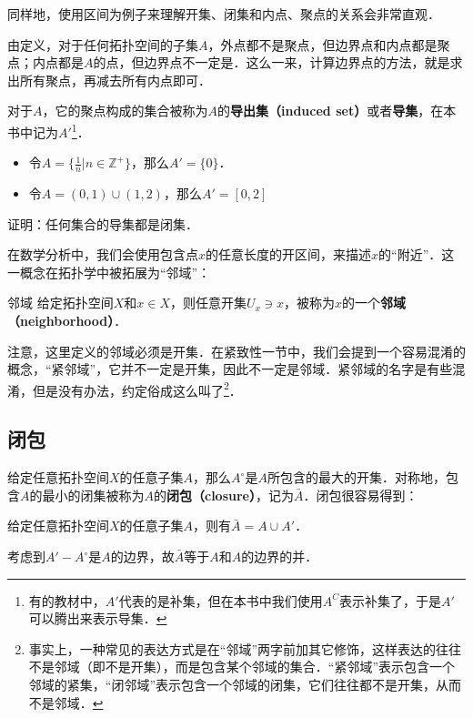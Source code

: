 同样地，使用区间为例子来理解开集、闭集和内点、聚点的关系会非常直观．

由定义，对于任何拓扑空间的子集$A$，外点都不是聚点，但边界点和内点都是聚点；内点都是$A$的点，但边界点不一定是．这么一来，计算边界点的方法，就是求出所有聚点，再减去所有内点即可．

对于$A$，它的聚点构成的集合被称为$A$的\textbf{导出集（induced set）}或者\textbf{导集}，在本书中记为$A'$\footnote{有的教材中，$A'$代表的是补集，但在本书中我们使用$A^C$表示补集了，于是$A'$可以腾出来表示导集．}．

\begin{example}{}
\begin{itemize}
\item 令$A=\{\frac{1}{n}|n\in\mathbb{Z}^+\}$，那么$A'=\{0\}$．
\item 令$A=(0,1)\cup(1,2)$，那么$A'=[0,2]$
\end{itemize}
\end{example}

\begin{exercise}{}
证明：任何集合的导集都是闭集．
\end{exercise}

在数学分析中，我们会使用包含点$x$的任意长度的开区间，来描述$x$的“附近”．这一概念在拓扑学中被拓展为“邻域”：

\begin{definition}{邻域}
给定拓扑空间$X$和$x\in X$，则任意开集$U_x\ni x$，被称为$x$的一个\textbf{邻域（neighborhood）}．
\end{definition}

注意，这里定义的邻域必须是开集．在紧致性一节中，我们会提到一个容易混淆的概念，“紧邻域”，它并不一定是开集，因此不一定是邻域．紧邻域的名字是有些混淆，但是没有办法，约定俗成这么叫了\footnote{事实上，一种常见的表达方式是在“邻域”两字前加其它修饰，这样表达的往往不是邻域（即不是开集），而是包含某个邻域的集合．“紧邻域”表示包含一个邻域的紧集，“闭邻域”表示包含一个邻域的闭集，它们往往都不是开集，从而不是邻域．}．



\subsection{闭包}

给定任意拓扑空间$X$的任意子集$A$，那么$A^\circ$是$A$所包含的最大的开集．对称地，包含$A$的最小的闭集被称为$A$的\textbf{闭包（closure）}，记为$\bar{A}$．闭包很容易得到：

\begin{theorem}{}
给定任意拓扑空间$X$的任意子集$A$，则有$\bar{A}=A\cup A'$．
\end{theorem}
\begin{corollary}{}\label{Topo0_cor1}
考虑到$A'-A^\circ$是$A$的边界，故$\bar{A}$等于$A$和$A$的边界的并．
\end{corollary}

